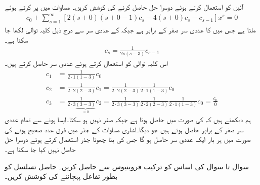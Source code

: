 آئیں  کو استعمال کرتے ہوئے دوسرا حل حاصل کرنے کی کوشش کریں۔  مساوات  میں  پر کرتے ہوئے
\begin{multline*}
[2\cdot 0(0-1)-4\cdot 0]c_0+\sum_{s=1}^{\infty}[2 (s+0)(s+0-1)c_s-4(s+0)c_s-c_{s-1}]x^{s}=0
\end{multline*}
ملتا ہے جس میں  کا عددی سر صفر کے برابر ہے جبکہ  کے عددی سر سے درج ذیل کلیہ توالی لکھا جا سکتا ہے۔
\begin{align*}
c_s=\frac{1}{2s(s-3)}c_{s-1}
\end{align*}
اس کلیہ توالی کو استعمال کرتے ہوئے عددی سر حاصل کرتے ہیں۔
\begin{align*}
c_1&=\frac{1}{2\cdot 1(1-3)}c_0\\
c_2&=\frac{1}{2\cdot 2(2-3)}c_1=\frac{1}{2\cdot 2(2-3)}\frac{1}{2\cdot 1(1-3)}c_0\\
c_3&=\frac{1}{2\cdot 3\underbrace{(3-3)}_{=0}}c_2=\frac{1}{2\cdot 3(3-3)}\frac{1}{2\cdot 2(2-3)}\frac{1}{2\cdot 1(1-3)}c_0=\frac{c_0}{0}
\end{align*}
ہم دیکھتے ہیں کہ  کی صورت میں  حاصل ہوتا ہے جبکہ  صفر نہیں ہو سکتا۔ایسا ہونے سے تمام عددی سر صفر کے برابر حاصل ہوتے ہیں جو  دیگا۔اشاری مساوات کے جذر میں فرق عدد صحیح ہونے کی صورت میں ہر بار ایک عددی سر  حاصل ہو گا جس کی بنا چھوٹا جذر استعمال کرتے ہوئے دوسرا حل حاصل نہیں کیا جا سکتا ہے۔

سوال  تا سوال  کی اساس کو ترکیب فروبنیوس سے حاصل کریں۔ حاصل تسلسل کو بطور تفاعل پہچاننے کی کوشش کریں۔\\

